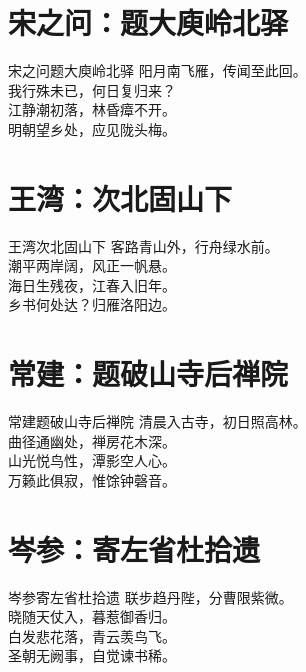 \documentclass[12pt,oneside,a5paper]{book}
\begin{document}
\chapter{宋之问：题大庾岭北驿}
\begin{poemzh}{宋之问}{题大庾岭北驿}
阳月南飞雁，传闻至此回。\\
我行殊未已，何日复归来？\\
江静潮初落，林昏瘴不开。\\
明朝望乡处，应见陇头梅。\\ 
\end{poemzh}

\chapter{王湾：次北固山下}
\begin{poemzh}{王湾}{次北固山下}
客路青山外，行舟绿水前。\\
潮平两岸阔，风正一帆悬。\\
海日生残夜，江春入旧年。\\
乡书何处达？归雁洛阳边。\\ 
\end{poemzh}

\chapter{常建：题破山寺后禅院}
\begin{poemzh}{常建}{题破山寺后禅院}
清晨入古寺，初日照高林。\\
曲径通幽处，禅房花木深。\\
山光悦鸟性，潭影空人心。\\
万籁此俱寂，惟馀钟磬音。\\ 
\end{poemzh}

\chapter{岑参：寄左省杜拾遗}
\begin{poemzh}{岑参}{寄左省杜拾遗}
联步趋丹陛，分曹限紫微。\\
晓随天仗入，暮惹御香归。\\
白发悲花落，青云羡鸟飞。\\
圣朝无阙事，自觉谏书稀。\\ 
\end{poemzh}
\end{document}
